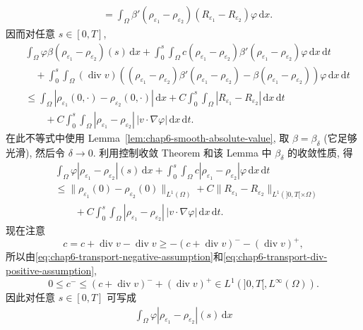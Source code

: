 \begin{sloppypar}
\begin{Proof}
\begin{itemize}
\[\begin{aligned}
 &=\int_\Omega\beta'(\rho_{\varepsilon_1}-\rho_{\varepsilon_2})
 (R_{\varepsilon_1}-R_{\varepsilon_2})\varphi\,\mathrm dx.
 \end{aligned}
 \]
 因而对任意 $s\in[0,T]$,
 \[
 \begin{aligned}
 &\int_\Omega\varphi\beta(\rho_{\varepsilon_1}-\rho_{\varepsilon_2})(s)\,\mathrm dx
 +\int_0^s\int_\Omega c(\rho_{\varepsilon_1}-\rho_{\varepsilon_2})
 \beta'(\rho_{\varepsilon_1}-\rho_{\varepsilon_2})\varphi\,\mathrm dx\,\mathrm dt\\
 &\quad+\int_0^s\int_\Omega(\operatorname{div}v)
 \left((\rho_{\varepsilon_1}-\rho_{\varepsilon_2})
 \beta'(\rho_{\varepsilon_1}-\rho_{\varepsilon_2})
 -\beta(\rho_{\varepsilon_1}-\rho_{\varepsilon_2})\right)\varphi\,\mathrm dx\,\mathrm dt\\
 &\leq\int_\Omega|\rho_{\varepsilon_1}(0,\cdot)-\rho_{\varepsilon_2}(0,\cdot)|\,\mathrm dx
 +C\int_0^s\int_\Omega|R_{\varepsilon_1}-R_{\varepsilon_2}|\,\mathrm dx\,\mathrm dt\\
 &\qquad+C\int_0^s\int_\Omega
 |\rho_{\varepsilon_1}-\rho_{\varepsilon_2}|\,|v\cdot\nabla\varphi|
 \,\mathrm dx\,\mathrm dt.
 \end{aligned}
 \]
 在此不等式中使用 Lemma~\ref{lem:chap6-smooth-absolute-value}, 取 $\beta=\beta_\delta$ (它足够光滑), 然后令 $\delta\to0$. 利用控制收敛 Theorem 和该 Lemma 中 $\beta_\delta$ 的收敛性质, 得
 \[
 \begin{aligned}
 &\int_\Omega\varphi|\rho_{\varepsilon_1}-\rho_{\varepsilon_2}|(s)\,\mathrm dx
 +\int_0^s\int_\Omega c|\rho_{\varepsilon_1}-\rho_{\varepsilon_2}|\varphi\,\mathrm dx\,\mathrm dt\\
 &\leq\|\rho_{\varepsilon_1}(0)-\rho_{\varepsilon_2}(0)\|_{L^1(\Omega)}
 +C\|R_{\varepsilon_1}-R_{\varepsilon_2}\|_{L^1(]0,T[\times\Omega)}\\
 &\qquad+C\int_0^s\int_\Omega
 |\rho_{\varepsilon_1}-\rho_{\varepsilon_2}|\,|v\cdot\nabla\varphi|
 \,\mathrm dx\,\mathrm dt.
 \end{aligned}
 \]
 现在注意
 \[
  c=c+\operatorname{div}v-\operatorname{div}v
  \geq-(c+\operatorname{div}v)^--(\operatorname{div}v)^+,
 \]
 所以由\eqref{eq:chap6-transport-negative-assumption}和\eqref{eq:chap6-transport-div-positive-assumption},
 \[
  0\leq c^-\leq(c+\operatorname{div}v)^-+(\operatorname{div}v)^+
  \in L^1(]0,T[,L^\infty(\Omega)).
 \]
 因此对任意 $s\in[0,T]$ 可写成
 \begin{equation}
 \begin{aligned}
 \int_\Omega\varphi|\rho_{\varepsilon_1}-\rho_{\varepsilon_2}|(s)\,\mathrm dx

\end{aligned}
\end{equation}
\end{itemize}
\end{Proof}
\end{sloppypar}
